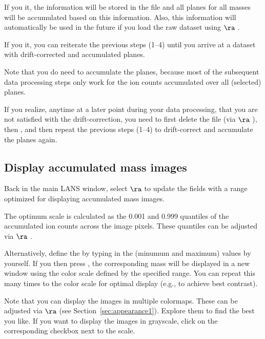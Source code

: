 \bul If you  it, the information will be stored in the file  and all planes for all masses will be accumulated based on this information. Also, this information will automatically be used in the future if you load the raw dataset using  $\ra$  .

\bul If you  it, you can reiterate the previous steps (1--4) until you arrive at a dataset with drift-corrected and accumulated planes.

\bul Note that you do need to accumulate the planes, because most of the subsequent data processing steps only work for the ion counts accumulated over all (selected) planes.

\bul If you realize, anytime at a later point during your data processing, that you are not satisfied with the drift-correction, you need to first delete the  file (via  $\ra$ ), then , and then repeat the previous steps (1--4) to drift-correct and accumulate the planes again.


\subsection{Display accumulated mass images}
\setcounter{step}{0}

\s Back in the main LANS window, select  $\ra$  to update the  fields with a range optimized for displaying accumulated mass images. 

\nb
\bul The optimum scale is calculated as the 0.001 and 0.999 quantiles of the accumulated ion counts across the image pixels. These quantiles can be adjusted via  $\ra$ .

\s Alternatively, define the   by typing in the  (minumum and maximum) values by yourself. If you then press , the corresponding mass will be displayed in a new window using the color scale defined by the specified range. You can repeat this many times to  the color scale for optimal display (e.g., to achieve best contrast).

\nb
\bul Note that you can display the images in multiple colormaps. These can be adjusted via  $\ra$  (see Section~\ref{sec:appearance1}). Explore them to find the best you like. If you want to display the images in grayscale, click on the corresponding  checkbox next to the scale.


